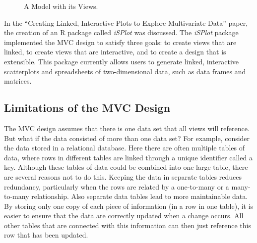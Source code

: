 \documentclass{article}[11pt]
\newcommand{\Rpackage}[1]{{\textit{#1}}}
\begin{document}
\begin{figure}[ht]
  \begin{center}
    \caption{ A Model with its Views. }
    \label{Fig:ExMVC}
  \end{center}
\end{figure}

In the ``Creating Linked, Interactive Plots to Explore Multivariate Data''
paper, the creation of an R package called \Rpackage{iSPlot} was discussed.
The \Rpackage{iSPlot} package implemented the MVC design to satisfy three
goals: to create views that are linked, to create views that are interactive,
and to create a design that is extensible.  This package currently allows
users to generate linked, interactive scatterplots and spreadsheets of
two-dimensional data, such as data frames and matrices. 

\subsection{Limitations of the MVC Design}\label{Ssec:Limit}

The MVC design assumes that there is one data set that all views will
reference.  But what if the data consisted of more than one data set?  For
example, consider the data stored in a relational database.  Here there are
often multiple tables of data, where rows in different tables are linked
through a unique identifier called a key.  Although these tables of data
could be combined into one large table, there are several reasons not to do
this.  Keeping the data in separate tables reduces redundancy, particularly
when the rows are related by a one-to-many or a many-to-many relationship.
Also separate data tables lead to more maintainable data.  By storing only one
copy of each piece of information (in a row in one table), it is easier to
ensure that the data are correctly updated when a change occurs.  All other
tables that are connected with this information can then just reference this
row that has been updated.
\end{document}
